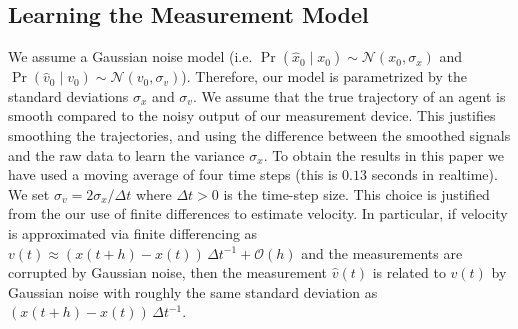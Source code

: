 \documentclass[letterpaper,10pt,conference]{ieeetran}
\begin{document}
  \subsection{Learning the Measurement Model}
  We assume a Gaussian noise model (i.e. $\Pr( \hat{x}_0 \mid x_0 ) \sim \mathcal{N}( x_0 , \sigma_x)$ and $\Pr( \hat{v}_0 \mid v_0 ) \sim \mathcal{N}( v_0, \sigma_v)$).
  Therefore, our model is parametrized by the standard deviations $\sigma_x$ and $\sigma_v$.
  We assume that the true trajectory of an agent is smooth compared to the noisy output of our measurement device.
  This justifies smoothing the trajectories, and using the difference between the smoothed signals and the raw data to learn the variance $\sigma_x$.
  To obtain the results in this paper we have used a moving average of four time steps (this is $0.13$ seconds in realtime).
  We set $\sigma_v = 2 \sigma_x / \Delta t$ where $\Delta t > 0$ is the time-step size.  
  This choice is justified from the our use of finite differences to estimate velocity.
  In particular, if velocity is approximated via finite differencing as $v(t) \approx (x(t+h) - x(t))\,\Delta t^{-1} + \mathcal{O}(h)$ and the measurements are corrupted by Gaussian noise, then the measurement $\hat{v}(t)$ is related to $v(t)$ by Gaussian noise with roughly the same standard deviation as $(x(t+h) - x(t))\,\Delta t^{-1}$.
  
\end{document}
